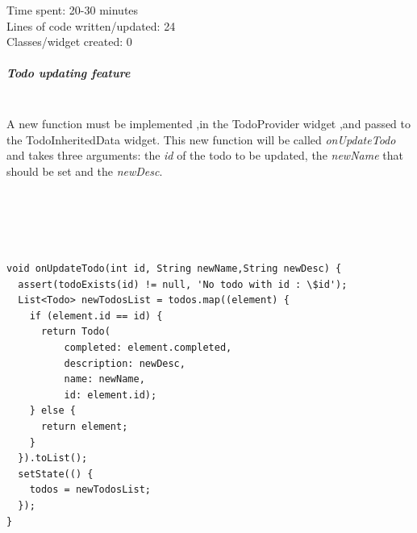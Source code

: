 Time spent: 20-30 minutes\\
Lines of code written/updated: 24\\ 
Classes/widget created: 0\\

\subparagraph{Todo updating feature} \mbox{} \\
\label{subpar:todo_updating_feature_inherited_wdiget}
A new function must be implemented ,in the TodoProvider widget ,and passed to the TodoInheritedData widget. This new function will be called \textit{onUpdateTodo } and takes three arguments: the \textit{id} of the todo to be updated, the \textit{newName } that should be set and the \textit{newDesc}.

\mbox{}\\

\begin{code}
\mbox{}\\
\begin{verbatim}

void onUpdateTodo(int id, String newName,String newDesc) {
  assert(todoExists(id) != null, 'No todo with id : \$id');
  List<Todo> newTodosList = todos.map((element) {
    if (element.id == id) {
      return Todo(
          completed: element.completed,
          description: newDesc,
          name: newName,
          id: element.id);
    } else {
      return element;
    }
  }).toList();
  setState(() {
    todos = newTodosList;
  });
}

\end{verbatim}
\end{code}
\mbox{}\\


